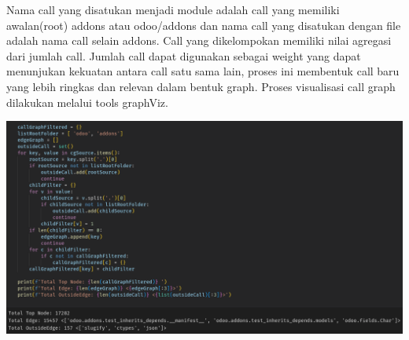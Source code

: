 Nama call yang disatukan menjadi module adalah call yang memiliki awalan(root) addons atau odoo/addons dan nama call yang disatukan dengan file adalah nama call selain addons. Call yang dikelompokan memiliki nilai agregasi dari jumlah call. Jumlah call dapat digunakan sebagai weight yang dapat menunjukan kekuatan antara call satu sama lain, proses ini membentuk call baru yang lebih ringkas dan relevan dalam bentuk graph. Proses visualisasi call graph dilakukan melalui tools graphViz.
\begin{center}
	\includegraphics[width=14cm]{img/bab_3/filterCG.png}
	\label{fig:asd}
\end{center}

